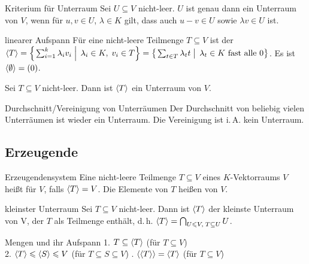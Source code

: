 \begin{Satz}{Kriterium für Unterraum}
    Sei $U \subseteq V$ nicht-leer.
    $U$ ist genau dann ein Unterraum von $V$, wenn für
    $u, v \in U$, $\lambda \in K$ gilt,
    dass auch $u - v \in U$ sowie $\lambda v \in U$ ist.
\end{Satz}

\begin{Def}{linearer Aufspann}
    Für eine nicht-leere Teilmenge $T \subseteq V$ ist der
     \\
    $\langle T \rangle = \left\{\left. \sum_{i=1}^k \lambda_i v_i \;\right|\;
    \lambda_i \in K,\; v_i \in T \right\} =
    \left\{\left. \sum_{t \in T} \lambda_t t \;\right|\;
    \lambda_t \in K \text{ fast alle } 0\right\}$.
    Es ist $\langle \emptyset \rangle = (0)$.
\end{Def}

\begin{Kor}
    Sei $T \subseteq V$ nicht-leer.
    Dann ist $\langle T \rangle$ ein Unterraum von $V$.
\end{Kor}

\begin{Lemma}{Durchschnitt/Vereinigung von Unterräumen}
    Der Durchschnitt von beliebig vielen Unterräumen ist wieder ein Unterraum.
    Die Vereinigung ist i.\,A. kein Unterraum.
\end{Lemma}

\subsection{%
    Erzeugende%
}

\begin{Def}{Erzeugendensystem}
    Eine nicht-leere Teilmenge $T \subseteq V$ eines $K$-Vektorraums $V$ heißt
     für $V$, falls $\langle T \rangle = V$.
    Die Elemente von $T$ heißen  von $V$.
\end{Def}

\begin{Satz}{kleinster Unterraum}
    Sei $T \subseteq V$ nicht-leer.
    Dann ist $\langle T \rangle$ der kleinste Unterraum von V, der $T$ als
    Teilmenge enthält, d.\,h.
    $\langle T \rangle = \bigcap_{U \leqslant V,\; T \subseteq U} U$.
\end{Satz}

\begin{Lemma}{Mengen und ihr Aufspann}
    1. $T \subseteq \langle T \rangle$ \quad (für $T \subseteq V$) \\
    2. $\langle T \rangle \leqslant \langle S \rangle \leqslant V$ \quad
    (für $T \subseteq S \subseteq V$) . $\langle \langle T \rangle \rangle = \langle T \rangle$ \quad (für $T \subseteq V$)
\end{Lemma}

